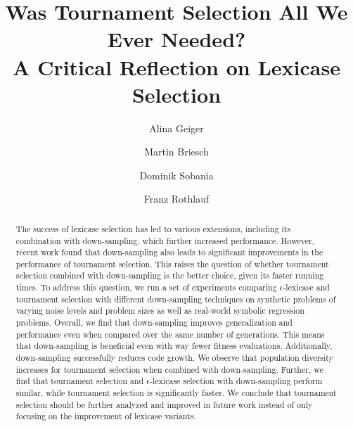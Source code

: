 \documentclass[runningheads]{llncs}
\begin{document}
\title{Was Tournament Selection All We Ever Needed? \\ A Critical Reflection on Lexicase Selection}



\author{Alina Geiger \and
Martin Briesch \and
Dominik Sobania \and
Franz Rothlauf} 



\maketitle            

\begin{abstract}
The success of lexicase selection has led to various extensions, including its combination with down-sampling, which further increased performance. However, recent work found that down-sampling also leads to significant improvements in the performance of tournament selection. This raises the question of whether tournament selection combined with down-sampling is the better choice, given its faster running times. To address this question, we run a set of experiments comparing $\epsilon$-lexicase and tournament selection with different down-sampling techniques on synthetic problems of varying noise levels and problem sizes as well as real-world symbolic regression problems. Overall, we find that down-sampling improves generalization and performance even when compared over the same number of generations. This means that down-sampling is beneficial even with way fewer fitness evaluations. Additionally, down-sampling successfully reduces code growth. We observe that population diversity increases for tournament selection when combined with down-sampling. Further, we find that tournament selection and $\epsilon$-lexicase selection with down-sampling perform similar, while tournament selection is significantly faster. We conclude that tournament selection should be further analyzed and improved in future work instead of only focusing on the improvement of lexicase variants. 


\end{abstract}
\end{document}

